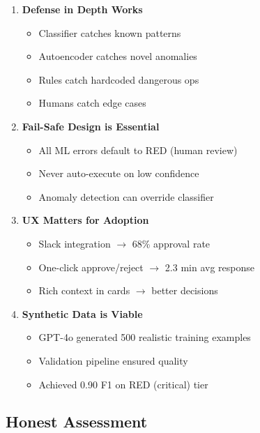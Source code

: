 \documentclass[11pt,a4paper]{article}
\begin{document}
\begin{enumerate}
    \item \textbf{Defense in Depth Works}
    \begin{itemize}
        \item Classifier catches known patterns
        \item Autoencoder catches novel anomalies
        \item Rules catch hardcoded dangerous ops
        \item Humans catch edge cases
    \end{itemize}
    
    \item \textbf{Fail-Safe Design is Essential}
    \begin{itemize}
        \item All ML errors default to RED (human review)
        \item Never auto-execute on low confidence
        \item Anomaly detection can override classifier
    \end{itemize}
    
    \item \textbf{UX Matters for Adoption}
    \begin{itemize}
        \item Slack integration $\rightarrow$ 68\% approval rate
        \item One-click approve/reject $\rightarrow$ 2.3 min avg response
        \item Rich context in cards $\rightarrow$ better decisions
    \end{itemize}
    
    \item \textbf{Synthetic Data is Viable}
    \begin{itemize}
        \item GPT-4o generated 500 realistic training examples
        \item Validation pipeline ensured quality
        \item Achieved 0.90 F1 on RED (critical) tier
    \end{itemize}
\end{enumerate}

\subsection{Honest Assessment}
\end{document}
